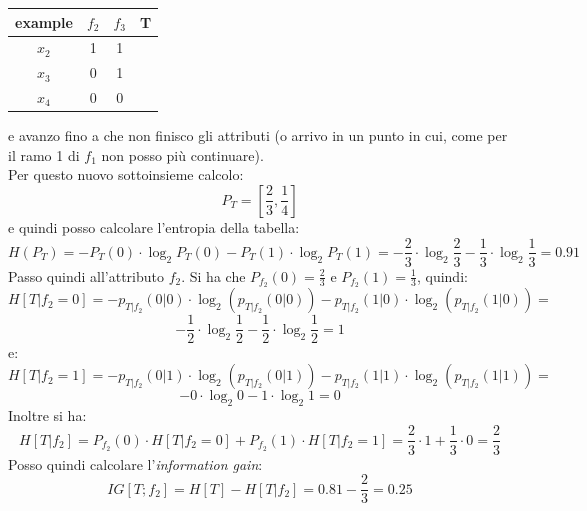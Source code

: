 \documentclass[a4paper,12pt, oneside]{book}
\begin{document}
\begin{esercizio}
  \begin{table}[H]
    \centering
    \begin{tabular}{c|c|c|c}
      example  & $f_2$ & $f_3$ & T\\
      \hline
      $x_2$ & 1 & 1 & \color{red}{0}\\
      $x_3$ & 0 & 1 & \color{darkgreen}{1}\\
      $x_4$ & 0 & 0 & \color{red}{0}\\
    \end{tabular}
  \end{table}
  e avanzo fino a che non finisco gli attributi (o arrivo in un punto in cui,
  come per il ramo 1 di $f_1$ non posso più continuare).\\
  Per questo nuovo sottoinsieme calcolo:
  \[P_T=\left[\frac{2}{3},\frac{1}{4}\right]\]
  e quindi posso calcolare l'entropia della tabella:
  \[H(P_T)=-P_T(0)\cdot \log_2 P_T(0)-P_T(1)\cdot\log_2
    P_T(1)=-\frac{2}{3}\cdot\log_2\frac{2}{3}-\frac{1}{3}\cdot\log_2
    \frac{1}{3}= 0.91\]
  Passo quindi all'attributo $f_2$. Si ha che $P_{f_2}(0)=\frac{2}{3}$ e
  $P_{f_2}(1)=\frac{1}{3}$, quindi:
  \[H[T|f_2=0]=-p_{T|f_2}(0|0)\cdot \log_2(p_{T|f_2}(0|0))-p_{T|f_2}(1|0)\cdot
    \log_2(p_{T|f_2}(1|0))=\]
  \[-\frac{1}{2}\cdot \log_2 \frac{1}{2}-\frac{1}{2}\cdot \log_2 \frac{1}{2}=1\]
  e:
  \[H[T|f_2=1]=-p_{T|f_2}(0|1)\cdot \log_2(p_{T|f_2}(0|1))-p_{T|f_2}(1|1)\cdot
    \log_2(p_{T|f_2}(1|1))=\]
  \[-0\cdot \log_2 0-1\cdot \log_2 1=0\]
  Inoltre si ha:
  \[H[T|f_2]=P_{f_2}(0)\cdot H[T|f_2=0]+P_{f_2}(1)\cdot
    H[T|f_2=1]=\frac{2}{3}\cdot 1+\frac{1}{3}\cdot 0=\frac{2}{3}\]
  Posso quindi calcolare l'\textit{information gain}:
  \[IG[T;f_2]=H[T]-H[T|f_2]=0.81-\frac{2}{3}=0.25\]
  

\end{esercizio}
\end{document}
